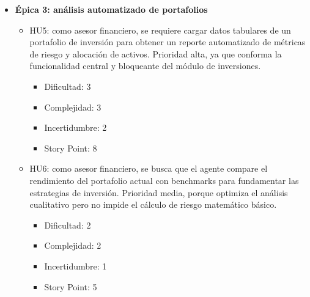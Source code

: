 \documentclass[
11pt, %
]{charter}
\begin{document}
\begin{itemize}
  \item \textbf{\'{E}pica 3: análisis automatizado de portafolios}
    \begin{itemize}
      \item HU5: como asesor financiero, se requiere cargar datos tabulares de un portafolio de inversión para obtener un reporte automatizado de métricas de riesgo y alocación de activos. Prioridad alta, ya que conforma la funcionalidad central y bloqueante del módulo de inversiones.
        \begin{itemize}
            \item Dificultad: 3
            \item Complejidad: 3
            \item Incertidumbre: 2
            \item Story Point: 8
        \end{itemize}
      \item HU6: como asesor financiero, se busca que el agente compare el rendimiento del portafolio actual con benchmarks para fundamentar las estrategias de inversión. Prioridad media, porque optimiza el análisis cualitativo pero no impide el cálculo de riesgo matemático básico.
        \begin{itemize}
            \item Dificultad: 2
            \item Complejidad: 2
            \item Incertidumbre: 1
            \item Story Point: 5
        \end{itemize}
    \end{itemize}


\end{itemize}
\end{document}
